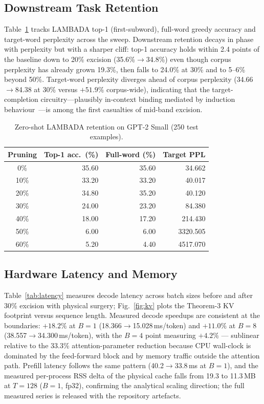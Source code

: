 \documentclass[11pt]{article}
\begin{document}
\subsection{Downstream Task Retention}
Table~\ref{tab:downstream} tracks LAMBADA top-1 (first-subword), full-word greedy
accuracy and target-word perplexity across the sweep. Downstream retention decays
in phase with perplexity but with a sharper cliff: top-1 accuracy holds within
2.4 points of the baseline down to 20\% excision (35.6\%$\to$34.8\%) even though
corpus perplexity has already grown 19.3\%, then falls to 24.0\% at 30\% and to
5--6\% beyond 50\%. Target-word perplexity diverges ahead of corpus perplexity
(34.66$\to$84.38 at 30\% versus $+51.9\%$ corpus-wide), indicating that the
target-completion circuitry---plausibly in-context binding mediated by induction
behaviour~\cite{olsson2022context}---is among the first casualties of
mid-band excision.

\begin{table}[!t]
\caption{Zero-shot LAMBADA retention on GPT-2 Small (250 test examples).}
\label{tab:downstream}
\centering
\footnotesize
\scriptsize
\begin{tabular}{crrr}
\toprule
Pruning & Top-1 acc.\ (\%) & Full-word (\%) & Target PPL \\
\midrule
0\% & 35.60 & 35.60 & 34.662 \\
10\% & 33.20 & 33.20 & 40.017 \\
20\% & 34.80 & 35.20 & 40.120 \\
30\% & 24.00 & 23.20 & 84.380 \\
40\% & 18.00 & 17.20 & 214.430 \\
50\% & 6.00 & 6.00 & 3320.505 \\
60\% & 5.20 & 4.40 & 4517.070 \\
\bottomrule
\end{tabular}
\end{table}

\subsection{Hardware Latency and Memory}
\label{sec:hardware}
Table~\ref{tab:latency} measures decode latency across batch sizes before and
after 30\% excision with physical surgery; Fig.~\ref{fig:kv} plots the
Theorem-3 KV footprint versus sequence length. Measured decode speedups are
consistent at the boundaries: $+18.2\%$ at $B{=}1$ (18.366$\to$15.028\,ms/token)
and $+11.0\%$ at $B{=}8$ (38.557$\to$34.300\,ms/token), with the $B{=}4$ point
measuring $+4.2\%$ --- sublinear relative to the 33.3\% attention-parameter
reduction because CPU wall-clock is dominated by the feed-forward block and by
memory traffic outside the attention path. Prefill latency follows the same
pattern (40.2$\to$33.8\,ms at $B{=}1$), and the measured per-process RSS delta of
the physical cache falls from 19.3 to 11.3\,MB at $T{=}128$ ($B{=}1$, fp32),
confirming the analytical scaling direction; the full measured series is released
with the repository artefacts.
\end{document}
